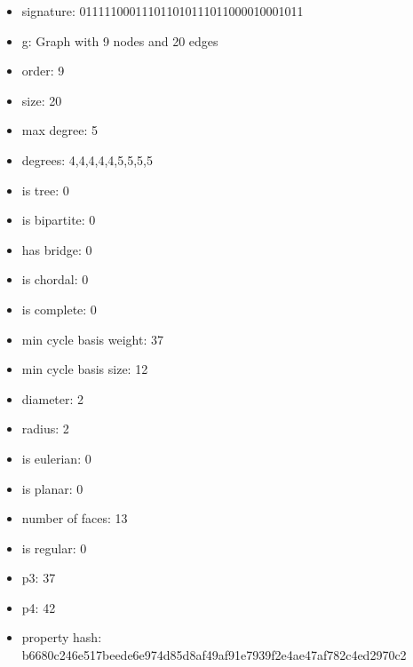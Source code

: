 \newpage
\begin{figure}
\end{figure}
\begin{itemize}
\item signature: 011111000111011010111011000010001011
\item g: Graph with 9 nodes and 20 edges
\item order: 9
\item size: 20
\item max degree: 5
\item degrees: 4,4,4,4,4,5,5,5,5
\item is tree: 0
\item is bipartite: 0
\item has bridge: 0
\item is chordal: 0
\item is complete: 0
\item min cycle basis weight: 37
\item min cycle basis size: 12
\item diameter: 2
\item radius: 2
\item is eulerian: 0
\item is planar: 0
\item number of faces: 13
\item is regular: 0
\item p3: 37
\item p4: 42
\item property hash: b6680c246e517beede6e974d85d8af49af91e7939f2e4ae47af782c4ed2970c2
\end{itemize}
